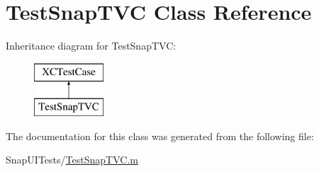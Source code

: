 \hypertarget{interface_test_snap_t_v_c}{}\section{Test\+Snap\+T\+VC Class Reference}
\label{interface_test_snap_t_v_c}
Inheritance diagram for Test\+Snap\+T\+VC\+:\begin{figure}[H]
\begin{center}
\leavevmode
\includegraphics[height=2.000000cm]{interface_test_snap_t_v_c}
\end{center}
\end{figure}


The documentation for this class was generated from the following file\+:\begin{DoxyCompactItemize}
\item 
Snap\+U\+I\+Tests/\hyperlink{_test_snap_t_v_c_8m}{Test\+Snap\+T\+V\+C.\+m}\end{DoxyCompactItemize}
